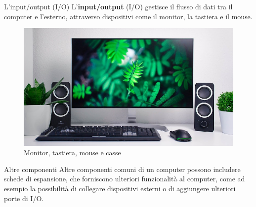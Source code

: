 \begin{frame}
	
	\begin{block}{L'input/output (I/O)} 
		L'\textbf{input/output} (I/O) gestisce il flusso di dati tra il computer e l'esterno, attraverso dispositivi come il monitor, la tastiera e il mouse.
	\end{block}
	
	\begin{figure}[!htbp] 
		\centering
		\includegraphics[width=0.8\linewidth]{images/2_le_architetture/io.jpg}
		\caption{Monitor, tastiera, mouse e casse}
		\label{fig:architectures_io}
	\end{figure}
	 
\end{frame}


\begin{frame}
	
	\begin{block}{Altre componenti}
		Altre componenti comuni di un computer possono includere schede di espansione, che forniscono ulteriori funzionalità al computer, come ad esempio la possibilità di collegare dispositivi esterni o di aggiungere ulteriori porte di I/O.
	\end{block}
	
	
\end{frame}



